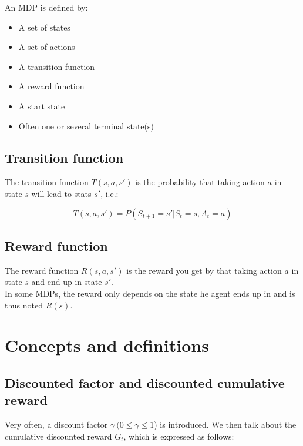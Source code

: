 An MDP is defined by:
\begin{itemize}
    \item A set of states
    \item A set of actions
    \item A transition function
    \item A reward function
    \item A start state
    \item Often one or several terminal state(s)
\end{itemize}


\subsection{Transition function} \label{sec:transition function}

The transition function $T(s,a,s')$ is the probability that taking action $a$ in state $s$ will lead to stats $s'$, i.e.:

\begin{equation} \label{eq:transition function}
    T(s,a,s') = P(S_{t+1}=s'|S_t=s,A_t=a) 
\end{equation}

\subsection{Reward function} \label{sec:reward function}

The reward function $R(s,a,s')$ is the reward you get by that taking action $a$ in state $s$ and end up in state $s'$.\\

In some MDPs, the reward only depends on the state he agent ends up in and is thus noted $R(s)$.

\section{Concepts and definitions}

\subsection{Discounted factor and discounted cumulative reward}\label{sec:gamma}

Very often, a discount factor $\gamma\ (0\leq \gamma \leq 1$)  is introduced. We then talk about the cumulative discounted reward $G_t$, which is expressed as follows:

